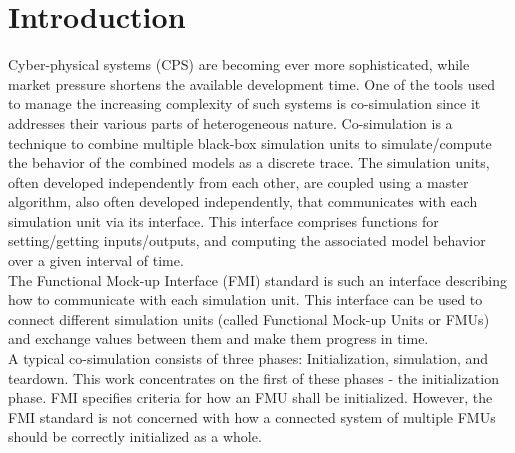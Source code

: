 \section{Introduction}\label{sc:introduction}
Cyber-physical systems (CPS) are becoming ever more sophisticated, while market pressure shortens the available development time. One of the tools used to manage the increasing complexity of such systems is co-simulation since it addresses their various parts of heterogeneous nature. Co-simulation is a technique to combine multiple black-box simulation units to simulate/compute the behavior of the combined models as a discrete trace\cite{Kubler2000}. The simulation units, often developed independently from each other, are coupled using a master algorithm, also often developed independently,
that communicates with each simulation unit via its interface. This interface comprises functions for setting/getting inputs/outputs, and computing the associated model behavior over a given interval of time. \\
The Functional Mock-up Interface (FMI) standard \cite{Blochwitz2012, fmi_2019} is such an interface describing how to communicate with each simulation unit. This interface can be used to connect different simulation units (called Functional Mock-up Units or FMUs) and exchange values between them and make them progress in time. \\
A typical co-simulation consists of three phases: Initialization, simulation, and teardown. This work concentrates on the first of these phases - the initialization phase. FMI specifies criteria for how an FMU shall be initialized. However, the FMI standard is not concerned with how a connected system of multiple FMUs should be correctly initialized as a whole. 
